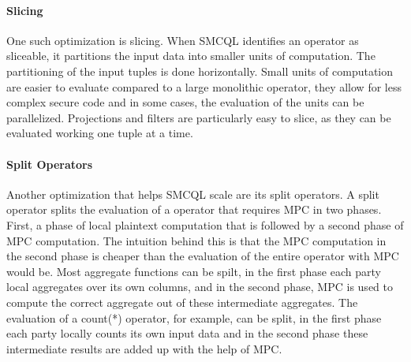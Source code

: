 \paragraph{Slicing}
One such optimization is slicing. When SMCQL identifies an operator as sliceable, it partitions the input data into smaller units of computation. The partitioning of the input tuples is done horizontally. Small units of computation are easier to evaluate compared to a large monolithic operator, they allow for less complex secure code and in some cases, the evaluation of the units can be parallelized. Projections and filters are particularly easy to slice, as they can be evaluated working one tuple at a time.
\paragraph{Split Operators} %
Another optimization that helps SMCQL scale are its split operators. A split operator splits the evaluation of a operator that requires MPC in two phases. First, a phase of local plaintext computation that is followed by a second phase of MPC computation. The intuition behind this is that the MPC computation in the second phase is cheaper than the evaluation of the entire operator with MPC would be. Most aggregate functions can be spilt, in the first phase each party local aggregates over its own columns, and in the second phase, MPC is used to compute the correct aggregate out of these intermediate aggregates. The evaluation of a count(*) operator, for example, can be split, in the first phase each party locally counts its own input data and in the second phase these intermediate results are added up with the help of MPC. %



